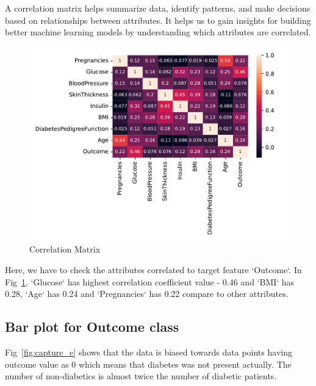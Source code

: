 A correlation matrix helps summarize data, identify patterns, and make decisions based on relationships between attributes. It helps us to gain insights for building better machine learning models by understanding which attributes are correlated.

\begin{figure}[ht]
    \centering    \includegraphics[scale=0.8]{figures/data_correlation.pdf}
    \caption{Correlation Matrix}
    \label{fig:capture_c}
\end{figure}

Here, we have to check the attributes correlated to target feature `Outcome`. In Fig~\ref{fig:capture_c}, `Glucose` has highest correlation coefficient value - 0.46 and `BMI` has 0.28, `Age` has 0.24 and `Pregnancies` has 0.22 compare to other attributes.

\subsection{Bar plot for Outcome class}
Fig~\ref{fig:capture_e} shows that the data is biased towards data points having outcome value as 0 which means that diabetes was not present actually. The number of non-diabetics is almost twice the number of diabetic patients.


